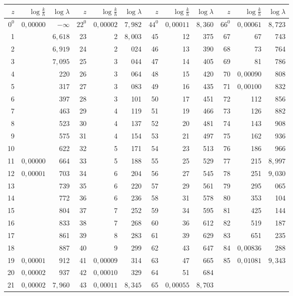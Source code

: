 \begin{center}\begingroup\fontsize{9.5}{12}\selectfont\setlength{\tabcolsep}{3pt}\renewcommand{\arraystretch}{1.13}
\begin{tabular}{r|r|r||r|r|r||r|r|r||r|r|r}
\hline\hline
$z$&$\log\frac{k}{h}$&$\log\lambda$&$z$&$\log\frac{k}{h}$&$\log\lambda$&$z$&$\log\frac{k}{h}$&$\log\lambda$&$z$&$\log\frac{k}{h}$&$\log\lambda$\\[.2em]
\hline\hline
$0^0$&$0{,}00000$&$-\infty$&$22^0$&$0{,}00002$&$7{,}982$&$44^0$&$0{,}00011$&$8{,}360$&$66^0$&$0{,}00061$&$8{,}723$\\
1&&$6{,}618$&23&2&$8{,}003$&45&12&375&67&67&743\\
2&&$6{,}919$&24&2&024&46&13&390&68&73&764\\
3&&$7{,}095$&25&3&044&47&14&405&69&81&786\\
4&&220&26&3&064&48&15&420&70&$0{,}00090$&808\\
5&&317&27&3&083&49&16&435&71&$0{,}00100$&832\\
6&&397&28&3&101&50&17&451&72&112&856\\
7&&463&29&4&119&51&19&466&73&126&882\\
8&&523&30&4&137&52&20&481&74&143&908\\
9&&575&31&4&154&53&21&497&75&162&936\\
10&&622&32&5&171&54&23&513&76&186&966\\
11&$0{,}00000$&664&33&5&188&55&25&529&77&215&$8{,}997$\\
12&$0{,}00001$&703&34&6&204&56&27&545&78&251&$9{,}030$\\
13&&739&35&6&220&57&29&561&79&295&065\\
14&&772&36&6&236&58&31&578&80&353&104\\
15&&804&37&7&252&59&34&595&81&425&144\\
16&&833&38&7&268&60&36&612&82&519&187\\
17&&861&39&8&283&61&39&629&83&651&235\\
18&&887&40&9&299&62&43&647&84&$0{,}00836$&288\\
19&$0{,}00001$&912&41&$0{,}00009$&314&63&47&665&85&$0{,}01081$&$9{,}343$\\
20&$0{,}00002$&937&42&$0{,}00010$&329&64&51&684&&&\\
21&$0{,}00002$&$7{,}960$&43&$0{,}00011$&$8{,}345$&65&$0{,}00055$&$8{,}703$&&&
\end{tabular}\endgroup\end{center}
\clearpage\endgroup
